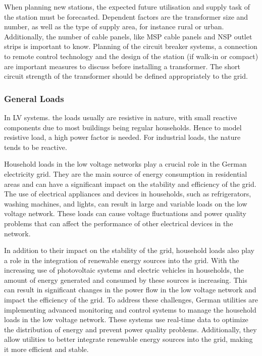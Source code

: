 When planning new stations, the expected future utilisation and supply task of the station must be forecasted. Dependent factors are the transformer size and number, as well as the type of supply area, for instance rural or urban. Additionally, the number of cable panels, like MSP cable panels and NSP outlet strips is important to know. Planning of the circuit breaker systems, a connection to remote control technology and the design of the station (if walk-in or compact) are important measures to discuss before installing a transformer. The short circuit strength of the transformer should be defined appropriately to the grid.   


\subsubsection{General Loads}

In LV systems. the loads usually are resistive in nature, with small reactive components due to most buildings being regular households. Hence to model resistive load, a high power factor is needed. For industrial loads, the nature tends to be reactive. 

Household loads in the low voltage networks play a crucial role in the German electricity grid. They are the main source of energy consumption in residential areas and can have a significant impact on the stability and efficiency of the grid. The use of electrical appliances and devices in households, such as refrigerators, washing machines, and lights, can result in large and variable loads on the low voltage network. These loads can cause voltage fluctuations and power quality problems that can affect the performance of other electrical devices in the network.

In addition to their impact on the stability of the grid, household loads also play a role in the integration of renewable energy sources into the grid. With the increasing use of photovoltaic systems and electric vehicles in households, the amount of energy generated and consumed by these sources is increasing. This can result in significant changes in the power flow in the low voltage network and impact the efficiency of the grid. To address these challenges, German utilities are implementing advanced monitoring and control systems to manage the household loads in the low voltage network. These systems use real-time data to optimize the distribution of energy and prevent power quality problems. Additionally, they allow utilities to better integrate renewable energy sources into the grid, making it more efficient and stable.


